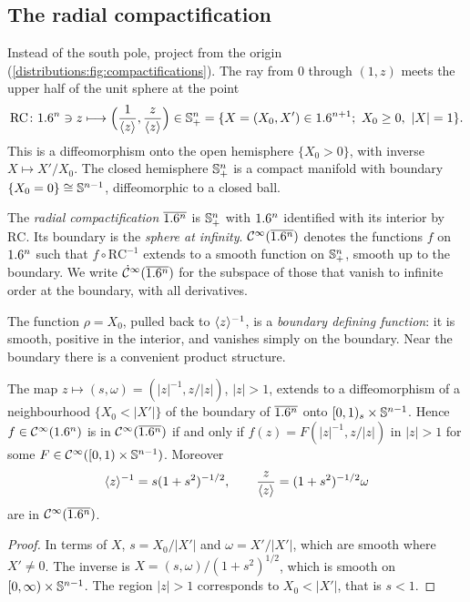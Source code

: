\subsection{The radial compactification}
Instead of the south pole, project from the origin (\cref{distributions:fig:compactifications}). The ray from $0$ through $(1,z)$
meets the upper half of the unit sphere at the point
\begin{equation}\label{distributions:eq:RC}
  \mathrm{RC}\colon1.6^n\ni z\longmapsto\Big(\frac1{\langle z\rangle},\frac z{\langle z\rangle}\Big)\in
  \mathbb{S}^n_+=\{X=(X_0,X')\in1.6^{n+1};\ X_0\ge0,\ |X|=1\}.
\end{equation}
This is a diffeomorphism onto the open hemisphere $\{X_0>0\}$, with inverse
$X\mapsto X'/X_0$. The closed hemisphere $\mathbb{S}^n_+$ is a compact manifold with
boundary $\{X_0=0\}\cong\mathbb{S}^{n-1}$, diffeomorphic to a closed ball.

\begin{definition}\label{distributions:def:RC}
The \emph{radial compactification} $\overline{1.6^n}$ is $\mathbb{S}^n_+$ with $1.6^n$ identified
with its interior by $\mathrm{RC}$. Its boundary is the \emph{sphere at infinity}.
$\mathcal{C}^\infty(\overline{1.6^n})$ denotes the functions $f$ on $1.6^n$ such that $f\circ\mathrm{RC}^{-1}$
extends to a smooth function on $\mathbb{S}^n_+$, smooth up to the boundary. We write
$\dot{\mathcal{C}}^\infty(\overline{1.6^n})$ for the subspace of those that vanish to infinite order at the
boundary, with all derivatives.
\end{definition}

The function $\rho=X_0$, pulled back to $\langle z\rangle^{-1}$, is a \emph{boundary defining
function}: it is smooth, positive in the interior, and vanishes simply on the boundary.
Near the boundary there is a convenient product structure.

\begin{lemma}\label{distributions:lem:collar}
The map $z\mapsto(s,\omega)=(|z|^{-1},z/|z|)$, $|z|>1$, extends to a diffeomorphism of
a neighbourhood $\{X_0<|X'|\}$ of the boundary of $\overline{1.6^n}$ onto
$[0,1)_s\times\mathbb{S}^{n-1}$. Hence $f\in\mathcal{C}^\infty(1.6^n)$ is in $\mathcal{C}^\infty(\overline{1.6^n})$ if and only if
$f(z)=F(|z|^{-1},z/|z|)$ in $|z|>1$ for some $F\in\mathcal{C}^\infty([0,1)\times\mathbb{S}^{n-1})$. Moreover
\[
  \langle z\rangle^{-1}=s(1+s^2)^{-1/2},\qquad\frac{z}{\langle z\rangle}=(1+s^2)^{-1/2}\omega
\]
are in $\mathcal{C}^\infty(\overline{1.6^n})$.
\end{lemma}
\begin{proof}
In terms of $X$, $s=X_0/|X'|$ and $\omega=X'/|X'|$, which are smooth where $X'\ne0$. The
inverse is $X=(s,\omega)/(1+s^2)^{1/2}$, which is smooth on $[0,\infty)\times\mathbb{S}^{n-1}$.
The region $|z|>1$ corresponds to $X_0<|X'|$, that is $s<1$.
\end{proof}

